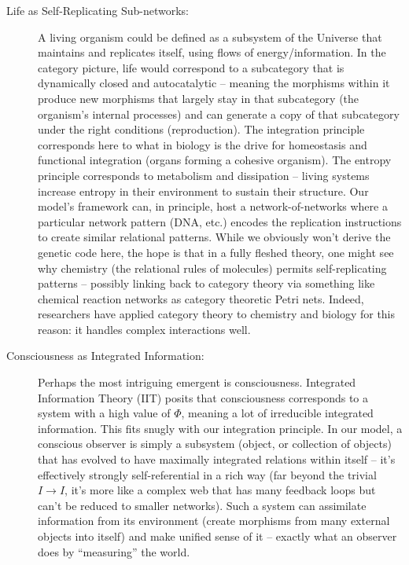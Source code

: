 \documentclass{article}
\begin{document}
\begin{description}
\item[Life as Self-Replicating Sub-networks:] A living organism could be defined as a subsystem of the Universe that maintains and replicates itself, using flows of energy/information. In the category picture, life would correspond to a subcategory that is dynamically closed and autocatalytic – meaning the morphisms within it produce new morphisms that largely stay in that subcategory (the organism’s internal processes) and can generate a copy of that subcategory under the right conditions (reproduction). The integration principle corresponds here to what in biology is the drive for homeostasis and functional integration (organs forming a cohesive organism). The entropy principle corresponds to metabolism and dissipation – living systems increase entropy in their environment to sustain their structure. Our model’s framework can, in principle, host a network-of-networks where a particular network pattern (DNA, etc.) encodes the replication instructions to create similar relational patterns. While we obviously won’t derive the genetic code here, the hope is that in a fully fleshed theory, one might see why chemistry (the relational rules of molecules) permits self-replicating patterns – possibly linking back to category theory via something like chemical reaction networks as category theoretic Petri nets. Indeed, researchers have applied category theory to chemistry and biology for this reason: it handles complex interactions well.

\item[Consciousness as Integrated Information:] Perhaps the most intriguing emergent is consciousness. Integrated Information Theory (IIT) posits that consciousness corresponds to a system with a high value of $\Phi$, meaning a lot of irreducible integrated information\cite{oizumi2014}. This fits snugly with our integration principle. In our model, a conscious observer is simply a subsystem (object, or collection of objects) that has evolved to have maximally integrated relations within itself – it’s effectively strongly self-referential in a rich way (far beyond the trivial $I \to I$, it’s more like a complex web that has many feedback loops but can’t be reduced to smaller networks). Such a system can assimilate information from its environment (create morphisms from many external objects into itself) and make unified sense of it – exactly what an observer does by “measuring” the world.


\end{description}
\end{document}
